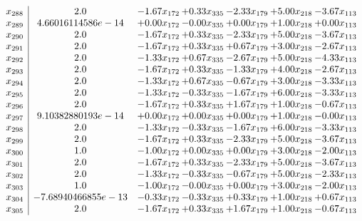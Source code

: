 \documentclass[8pt]{article}
\begin{document}
\[\begin{array}{c| c c@{\hskip 2pt} c@{\hskip 2pt} c@{\hskip 2pt} c@{\hskip 2pt} c@{\hskip 2pt} }
 x_{288}   &  2.0 & -1.67 x_{172} & +  0.33 x_{335} & -2.33 x_{179} & +  5.00 x_{218} & -3.67 x_{113}\\
 x_{289}   &  4.66016114586e-14 & +  0.00 x_{172} & -0.00 x_{335} & +  0.00 x_{179} & +  1.00 x_{218} & +  0.00 x_{113}\\
 x_{290}   &  2.0 & -1.67 x_{172} & +  0.33 x_{335} & -2.33 x_{179} & +  5.00 x_{218} & -3.67 x_{113}\\
 x_{291}   &  2.0 & -1.67 x_{172} & +  0.33 x_{335} & +  0.67 x_{179} & +  3.00 x_{218} & -2.67 x_{113}\\
 x_{292}   &  2.0 & -1.33 x_{172} & +  0.67 x_{335} & -2.67 x_{179} & +  5.00 x_{218} & -4.33 x_{113}\\
 x_{293}   &  2.0 & -1.67 x_{172} & +  0.33 x_{335} & -1.33 x_{179} & +  4.00 x_{218} & -2.67 x_{113}\\
 x_{294}   &  2.0 & -1.33 x_{172} & +  0.67 x_{335} & -0.67 x_{179} & +  3.00 x_{218} & -3.33 x_{113}\\
 x_{295}   &  2.0 & -1.33 x_{172} & -0.33 x_{335} & -1.67 x_{179} & +  6.00 x_{218} & -3.33 x_{113}\\
 x_{296}   &  2.0 & -1.67 x_{172} & +  0.33 x_{335} & +  1.67 x_{179} & +  1.00 x_{218} & -0.67 x_{113}\\
 x_{297}   &  9.10382880193e-14 & +  0.00 x_{172} & +  0.00 x_{335} & +  0.00 x_{179} & +  1.00 x_{218} & -0.00 x_{113}\\
 x_{298}   &  2.0 & -1.33 x_{172} & -0.33 x_{335} & -1.67 x_{179} & +  6.00 x_{218} & -3.33 x_{113}\\
 x_{299}   &  2.0 & -1.67 x_{172} & +  0.33 x_{335} & -2.33 x_{179} & +  5.00 x_{218} & -3.67 x_{113}\\
 x_{300}   &  1.0 & -1.00 x_{172} & +  0.00 x_{335} & +  0.00 x_{179} & +  3.00 x_{218} & -2.00 x_{113}\\
 x_{301}   &  2.0 & -1.67 x_{172} & +  0.33 x_{335} & -2.33 x_{179} & +  5.00 x_{218} & -3.67 x_{113}\\
 x_{302}   &  2.0 & -1.33 x_{172} & -0.33 x_{335} & -0.67 x_{179} & +  5.00 x_{218} & -2.33 x_{113}\\
 x_{303}   &  1.0 & -1.00 x_{172} & -0.00 x_{335} & +  0.00 x_{179} & +  3.00 x_{218} & -2.00 x_{113}\\
 x_{304}   &  -7.68940466855e-13 & -0.33 x_{172} & -0.33 x_{335} & +  0.33 x_{179} & +  1.00 x_{218} & +  0.67 x_{113}\\
 x_{305}   &  2.0 & -1.67 x_{172} & +  0.33 x_{335} & +  1.67 x_{179} & +  1.00 x_{218} & -0.67 x_{113}\\

\end{array}\]
\end{document}
